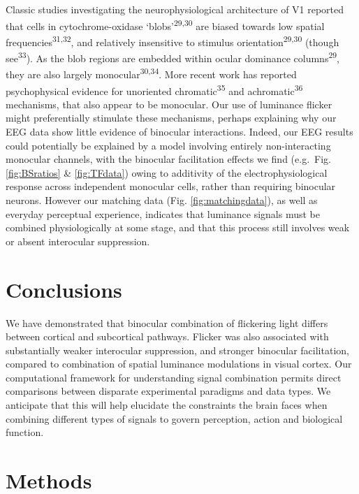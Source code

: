 \documentclass[
]{article}
\begin{document}
Classic studies investigating the neurophysiological architecture of V1 reported that cells in cytochrome-oxidase `blobs'\textsuperscript{29,30} are biased towards low spatial frequencies\textsuperscript{31,32}, and relatively insensitive to stimulus orientation\textsuperscript{29,30} (though see\textsuperscript{33}). As the blob regions are embedded within ocular dominance columns\textsuperscript{29}, they are also largely monocular\textsuperscript{30,34}. More recent work has reported psychophysical evidence for unoriented chromatic\textsuperscript{35} and achromatic\textsuperscript{36} mechanisms, that also appear to be monocular. Our use of luminance flicker might preferentially stimulate these mechanisms, perhaps explaining why our EEG data show little evidence of binocular interactions. Indeed, our EEG results could potentially be explained by a model involving entirely non-interacting monocular channels, with the binocular facilitation effects we find (e.g.~Fig. \ref{fig:BSratios} \& \ref{fig:TFdata}) owing to additivity of the electrophysiological response across independent monocular cells, rather than requiring binocular neurons. However our matching data (Fig. \ref{fig:matchingdata}), as well as everyday perceptual experience, indicates that luminance signals must be combined physiologically at some stage, and that this process still involves weak or absent interocular suppression.

\hypertarget{conclusions}{%
\section{Conclusions}\label{conclusions}}

We have demonstrated that binocular combination of flickering light differs between cortical and subcortical pathways. Flicker was also associated with substantially weaker interocular suppression, and stronger binocular facilitation, compared to combination of spatial luminance modulations in visual cortex. Our computational framework for understanding signal combination permits direct comparisons between disparate experimental paradigms and data types. We anticipate that this will help elucidate the constraints the brain faces when combining different types of signals to govern perception, action and biological function.

\hypertarget{methods}{%
\section{Methods}\label{methods}}
\end{document}
